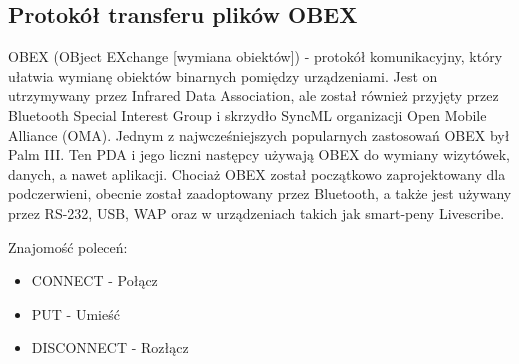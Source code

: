 \documentclass[a4paper,12pt]{extarticle}  %
\begin{document}
\subsection{Protokół transferu plików OBEX}
OBEX (OBject EXchange [wymiana obiektów]) - protokół komunikacyjny, który ułatwia wymianę obiektów binarnych pomiędzy urządzeniami. 
Jest on utrzymywany przez Infrared Data Association, ale został również przyjęty przez Bluetooth Special Interest Group i skrzydło SyncML 
organizacji Open Mobile Alliance (OMA). Jednym z najwcześniejszych popularnych zastosowań OBEX był Palm III.
Ten PDA i jego liczni następcy używają OBEX do wymiany wizytówek, danych, a nawet aplikacji. Chociaż OBEX został początkowo zaprojektowany 
dla podczerwieni, obecnie został zaadoptowany przez Bluetooth, a także jest używany przez RS-232, USB, WAP oraz w urządzeniach takich 
jak smart-peny Livescribe. 

Znajomość poleceń:
\begin{itemize}
	\item CONNECT - Połącz
	\item PUT - Umieść
	\item DISCONNECT - Rozłącz
\end{itemize}
\end{document}
